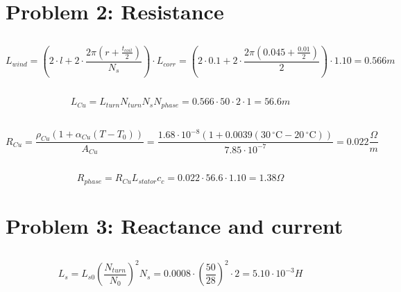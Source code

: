 \documentclass[11pt,a4paper]{article}
\newcommand{\degCel}{\,^\circ\mathrm{C}}
\begin{document}
\vspace{0.5cm}

\section{Problem 2: Resistance}
\subsection{}
\begin{equation}
    L_{wind} = \left(2\cdot l + 2\cdot \frac{2\pi \left(r + \frac{t_{coil}}{2}\right)}{N_s}\right)\cdot L_{corr}
    = \left(2\cdot0.1 + 2\cdot \frac{2\pi \left(0.045 + \frac{0.01}{2}\right)}{2}\right)\cdot 1.10
    = 0.566m
\end{equation}

\subsection{}
\begin{equation}
    L_{Cu} = L_{turn}N_{turn}N_sN_{phase} = 0.566\cdot50\cdot2\cdot1 = 56.6m
\end{equation}

\subsection{}
\begin{equation}
    R_{Cu} = \frac{\rho_{Cu}(1 + \alpha_{Cu}(T-T_0))}{A_{Cu}}
    = \frac{1.68\cdot10^{-8}(1 + 0.0039(30\degCel - 20\degCel))}{7.85\cdot10^{-7}}
    = 0.022\frac{\Omega}{m}
\end{equation}

\subsection{}
\begin{equation}
     R_{phase} = R_{Cu}L_{stator}c_c = 0.022\cdot56.6\cdot1.10 = 1.38\Omega
\end{equation}

\vspace{0.5cm}

\section{Problem 3: Reactance and current}
\subsection{}
\begin{equation}
    L_s = L_{s0}\left(\frac{N_{turn}}{N_0}\right)^2N_s
    = 0.0008\cdot\left(\frac{50}{28}\right)^2\cdot2 = 5.10\cdot10^{-3}\unit{H}
\end{equation}
\end{document}
